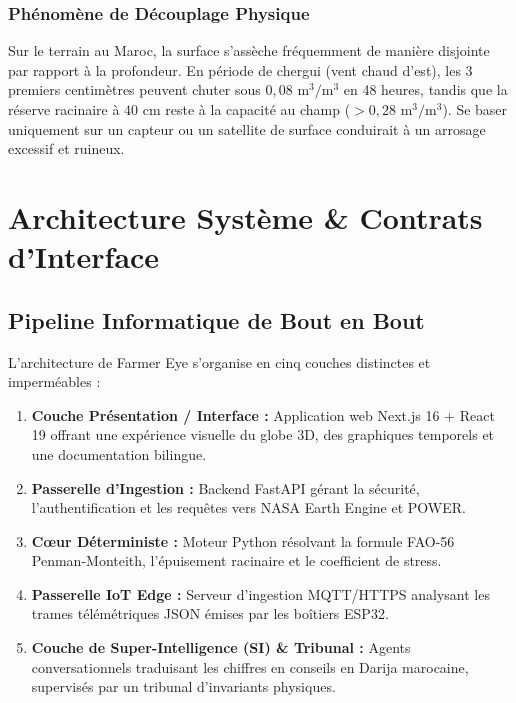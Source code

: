 \documentclass[11pt,a4paper,oneside]{report}
\begin{document}
\subsection{Phénomène de Découplage Physique}
Sur le terrain au Maroc, la surface s'assèche fréquemment de manière disjointe par rapport à la profondeur. En période de chergui (vent chaud d'est), les 3 premiers centimètres peuvent chuter sous $0,08\text{ m}^3/\text{m}^3$ en 48 heures, tandis que la réserve racinaire à $40\text{ cm}$ reste à la capacité au champ ($> 0,28\text{ m}^3/\text{m}^3$). Se baser uniquement sur un capteur ou un satellite de surface conduirait à un arrosage excessif et ruineux.

\chapter{Architecture Système \& Contrats d'Interface}

\section{Pipeline Informatique de Bout en Bout}
L'architecture de Farmer Eye s'organise en cinq couches distinctes et imperméables :
\begin{enumerate}
    \item \textbf{Couche Présentation / Interface :} Application web Next.js 16 + React 19 offrant une expérience visuelle du globe 3D, des graphiques temporels et une documentation bilingue.
    \item \textbf{Passerelle d'Ingestion :} Backend FastAPI gérant la sécurité, l'authentification et les requêtes vers NASA Earth Engine et POWER.
    \item \textbf{Cœur Déterministe :} Moteur Python résolvant la formule FAO-56 Penman-Monteith, l'épuisement racinaire et le coefficient de stress.
    \item \textbf{Passerelle IoT Edge :} Serveur d'ingestion MQTT/HTTPS analysant les trames télémétriques JSON émises par les boîtiers ESP32.
    \item \textbf{Couche de Super-Intelligence (SI) \& Tribunal :} Agents conversationnels traduisant les chiffres en conseils en Darija marocaine, supervisés par un tribunal d'invariants physiques.
\end{enumerate}
\end{document}
